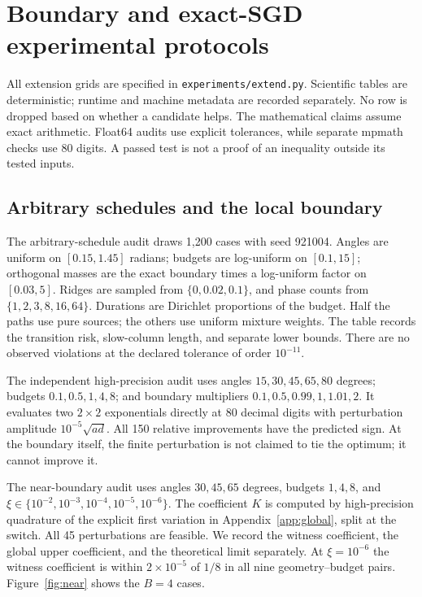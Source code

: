 \section{Boundary and exact-SGD experimental protocols}\label{app:extension_experiments}
All extension grids are specified in \texttt{experiments/extend.py}. Scientific tables are deterministic; runtime and machine metadata are recorded separately. No row is dropped based on whether a candidate helps. The mathematical claims assume exact arithmetic. Float64 audits use explicit tolerances, while separate mpmath checks use 80 digits. A passed test is not a proof of an inequality outside its tested inputs.

\subsection{Arbitrary schedules and the local boundary}
The arbitrary-schedule audit draws 1,200 cases with seed 921004. Angles are uniform on $[0.15,1.45]$ radians; budgets are log-uniform on $[0.1,15]$; orthogonal masses are the exact boundary times a log-uniform factor on $[0.03,5]$. Ridges are sampled from $\{0,0.02,0.1\}$, and phase counts from $\{1,2,3,8,16,64\}$. Durations are Dirichlet proportions of the budget. Half the paths use pure sources; the others use uniform mixture weights. The table records the transition risk, slow-column length, and separate lower bounds. There are no observed violations at the declared tolerance of order $10^{-11}$.

The independent high-precision audit uses angles $15,30,45,65,80$ degrees; budgets $0.1,0.5,1,4,8$; and boundary multipliers $0.1,0.5,0.99,1,1.01,2$. It evaluates two $2\times2$ exponentials directly at 80 decimal digits with perturbation amplitude $10^{-5}\sqrt{ad}$. All 150 relative improvements have the predicted sign. At the boundary itself, the finite perturbation is not claimed to tie the optimum; it cannot improve it.

The near-boundary audit uses angles $30,45,65$ degrees, budgets $1,4,8$, and $\xi\in\{10^{-2},10^{-3},10^{-4},10^{-5},10^{-6}\}$. The coefficient $K$ is computed by high-precision quadrature of the explicit first variation in Appendix~\ref{app:global}, split at the switch. All 45 perturbations are feasible. We record the witness coefficient, the global upper coefficient, and the theoretical limit separately. At $\xi=10^{-6}$ the witness coefficient is within $2\times10^{-5}$ of $1/8$ in all nine geometry--budget pairs. Figure~\ref{fig:near} shows the $B=4$ cases.

